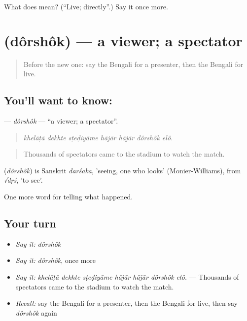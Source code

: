 \begin{tcolorbox}[breakable,colback=teal!4,colframe=teal!35!black,title={Before you move on}]
What does  mean? (\textquotedblleft{}Live; directly\textquotedblright{}.) Say it once more.
\end{tcolorbox}
\section[\texorpdfstring{\bn{দর্শক} (dôrshôk)}{দর্শক (dôrshôk)}]{ (dôrshôk) — a viewer; a spectator}

\label{lesson:BN-C299-dorshok}



\begin{quote}
Before the new one: say the Bengali for a presenter, then the Bengali for live.
\end{quote}

\subsection*{You'll want to know: }
\textbf{} — \emph{dôrshôk} — \textquotedblleft{}a viewer; a spectator\textquotedblright{}.

\begin{quote}
      
\end{quote}

\begin{quote}
\emph{khelāṭā dekhte sṭeḍiyāme hājār hājār dôrshôk elô.}
\end{quote}

\begin{quote}
Thousands of spectators came to the stadium to watch the match.
\end{quote}

\begin{cousinweb}
\textbf{} (\emph{dôrshôk}) is Sanskrit \emph{darśaka}, 'seeing, one who looks' (Monier-Williams), from \emph{√dṛś}, 'to see'.
\end{cousinweb}

\begin{grammarlens}[title={What you've built}]
One more word for telling what happened.
\end{grammarlens}

\subsection*{Your turn}
\begin{itemize}
\raggedright
  \item \emph{Say it:} \emph{dôrshôk}
  \item \emph{Say it:} \emph{dôrshôk}, once more
  \item \emph{Say it:} \emph{khelāṭā dekhte sṭeḍiyāme hājār hājār dôrshôk elô.} — Thousands of spectators came to the stadium to watch the match.
  \item \emph{Recall:} say the Bengali for a presenter, then the Bengali for live, then say \emph{dôrshôk} again
\end{itemize}

